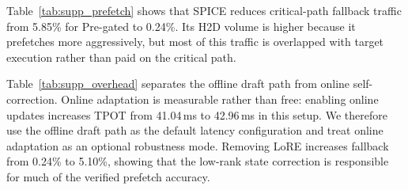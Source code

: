 Table~\ref{tab:supp_prefetch} shows that SPICE reduces critical-path fallback
traffic from 5.85\% for Pre-gated to 0.24\%. Its H2D volume is higher because it
prefetches more aggressively, but most of this traffic is overlapped with target
execution rather than paid on the critical path.

\begin{table}[t]
\centering
\caption{Draft-path overhead and LoRE ablation.}
\label{tab:supp_overhead}
\scriptsize
{}
\end{table}

Table~\ref{tab:supp_overhead} separates the offline draft path from online
self-correction. Online adaptation is measurable rather than free: enabling
online updates increases TPOT from 41.04\,ms to 42.96\,ms in this setup. We
therefore use the offline draft path as the default latency configuration and
treat online adaptation as an optional robustness mode. Removing LoRE increases
fallback from 0.24\% to 5.10\%, showing that the low-rank state correction is
responsible for much of the verified prefetch accuracy.

\begin{table}[t]
\centering
\caption{Top-$K$ stress study under a tighter cache budget.}
\label{tab:supp_topk}
\scriptsize
{}
\end{table}

